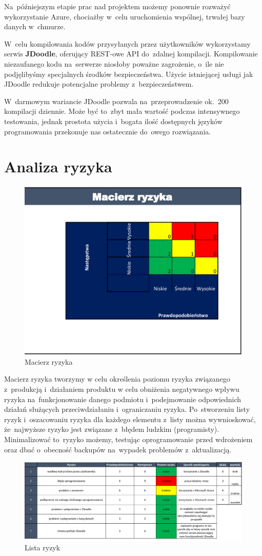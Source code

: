 \documentclass{article}
\begin{document}
Na~późniejszym etapie prac nad projektem możemy ponownie rozważyć wykorzystanie Azure, chociażby w~celu uruchomienia wspólnej, trwałej bazy danych w~chmurze.

W~celu kompilowania kodów przysyłanych przez użytkowników wykorzystamy serwis \textbf{JDoodle}, oferujący REST-owe API do~zdalnej kompilacji. Kompilowanie niezaufanego kodu na~serwerze niosłoby poważne zagrożenie, o~ile nie podjęlibyśmy specjalnych środków bezpieczeństwa. Użycie istniejącej usługi jak JDoodle redukuje potencjalne problemy z~bezpieczeństwem.

W~darmowym wariancie JDoodle pozwala na~przeprowadzenie ok.~200 kompilacji dziennie. Może być to~zbyt mała wartość podczas intensywnego testowania, jednak prostota użycia i~bogata ilość dostępnych języków programowania przekonuje nas ostatecznie do~owego rozwiązania.

\section{Analiza ryzyka}


\begin{figure}[H]
	\centering
	\includegraphics[width=.5\linewidth]{macierz_ryzyka.png}
	\caption{Macierz ryzyka}
\end{figure}

Macierz ryzyka tworzymy w celu określenia poziomu ryzyka związanego z~produkcją i~działaniem produktu w celu obniżenia negatywnego wpływu ryzyka na~funkcjonowanie danego podmiotu i~podejmowanie odpowiednich działań służących przeciwdziałaniu i~ograniczaniu ryzyka. Po~stworzeniu listy ryzyk i~oszacowaniu ryzyka dla każdego elementu z~listy można wywnioskować, że~najwyższe ryzyko jest związane z~błędem ludzkim (programisty). Minimalizować to~ryzyko możemy, testując oprogramowanie przed wdrożeniem oraz dbać o~obecność backupów na~wypadek problemów z~aktualizacją.

\begin{figure}[H]
	\centering
	\includegraphics[width=.95\linewidth]{lista_ryzyk.png}
	\caption{Lista ryzyk}
\end{figure}
\end{document}
